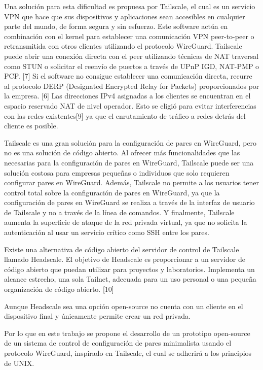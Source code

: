 Una solución para esta dificultad es propuesa por Tailscale, el cual es un servicio VPN que hace que sus dispositivos y aplicaciones sean accesibles en cualquier parte del mundo, de forma segura y sin esfuerzo. Este software actúa en combinación con el kernel para establecer una comunicación VPN peer-to-peer o retransmitida con otros clientes utilizando el protocolo WireGuard. Tailscale puede abrir una conexión directa con el peer utilizando técnicas de NAT traversal como STUN o solicitar el reenvío de puertos a través de UPnP IGD, NAT-PMP o PCP. [7] Si el software no consigue establecer una comunicación directa, recurre al protocolo DERP (Designated Encrypted Relay for Packets) proporcionados por la empresa. [6] Las direcciones IPv4 asignadas a los clientes se encuentran en el espacio reservado NAT de nivel operador. Esto se eligió para evitar interferencias con las redes existentes[9] ya que el enrutamiento de tráfico a redes detrás del cliente es posible.

Tailscale es una gran solución para la configuración de pares en WireGuard, pero no es una solución de código abierto. Al ofrecer más funcionalidades que las necesarias para la configuración de pares en WireGuard, Tailscale puede ser una solución costosa para empresas pequeñas o individuos que solo requieren configurar pares en WireGuard. Además, Tailscale no permite a los usuarios tener control total sobre la configuración de pares en WireGuard, ya que la configuración de pares en WireGuard se realiza a través de la interfaz de usuario de Tailscale y no a través de la línea de comandos. Y finalmente, Tailscale aumenta la superficie de ataque de la red privada virtual, ya que no solicita la autenticación al usar un servicio crítico como SSH entre los pares.

Existe una alternativa de código abierto del servidor de control de Tailscale llamado Headscale. El objetivo de Headscale es proporcionar a un servidor de código abierto que puedan utilizar para proyectos y laboratorios. Implementa un alcance estrecho, una sola Tailnet, adecuada para un uso personal o una pequeña organización de código abierto. [10]


Aunque Headscale sea una opción open-source no cuenta con un cliente en el dispositivo final y únicamente permite crear un red privada.

Por lo que en este trabajo se propone el desarrollo de un prototipo open-source de un sistema de control de configuración de pares minimalista usando el protocolo WireGuard, inspirado en Tailscale, el cual se adherirá a los principios de UNIX.

